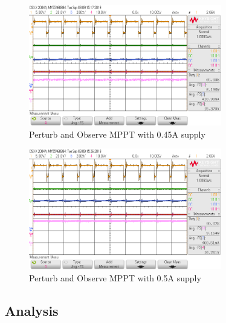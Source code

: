 \documentclass[]{article}
\begin{document}
 				\begin{figure}[H]
 					\centering
 					\includegraphics[width=0.75\textwidth]{Lab4Results/0_45A_Supply}
 					\caption{Perturb and Observe MPPT with 0.45A supply}
 					\label{fig:Lab4_0.45A}
 				\end{figure}
 				\begin{figure}[H]
 					\centering
 					\includegraphics[width=0.75\textwidth]{Lab4Results/0_50A_Supply}
 					\caption{Perturb and Observe MPPT with 0.5A supply}
 					\label{fig:Lab4_0.5A}
 				\end{figure}
 		\newpage
 		\subsection{Analysis}
\end{document}
